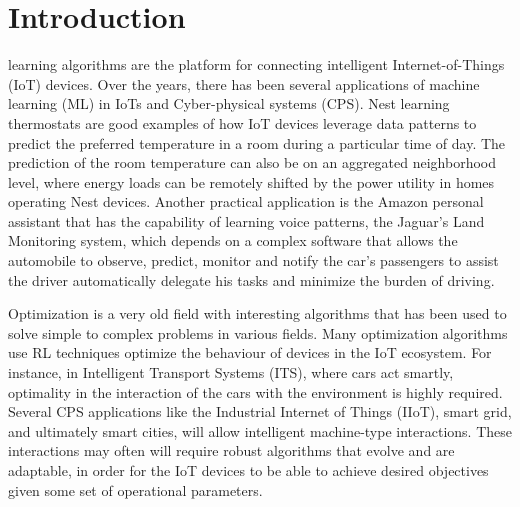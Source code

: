 \documentclass[journal]{IEEEtran}
\begin{document}
%
\IEEEpeerreviewmaketitle

\section{Introduction}
\label{sec:Introduction}
 learning algorithms are the platform for connecting intelligent Internet-of-Things (IoT) devices. Over the years, there has been several applications of machine learning (ML) in IoTs and Cyber-physical systems (CPS). Nest learning thermostats are good examples of how IoT devices leverage data patterns to predict the preferred temperature in a room during a particular time of day. The prediction of the room temperature can also be on an aggregated neighborhood level, where energy loads can be remotely shifted by the power utility in homes operating Nest devices. Another practical application is the Amazon personal assistant that has the capability of learning voice patterns, the Jaguar's Land Monitoring system, which depends on a complex software that allows the automobile to observe, predict, monitor and notify the car's passengers to assist the driver automatically delegate his tasks and minimize the burden of driving.

Optimization is a very old field with interesting algorithms that has been used to solve simple to complex problems in various fields. Many optimization algorithms use RL techniques optimize the behaviour of devices in the IoT ecosystem. For instance, in Intelligent Transport Systems (ITS), where cars act smartly, optimality in the interaction of the cars with the environment is highly required. Several CPS applications like the Industrial Internet of Things (IIoT), smart grid, and ultimately smart cities, will allow intelligent machine-type interactions. These interactions may often will require robust algorithms that evolve and are adaptable, in order for the IoT devices to be able to achieve desired objectives given some set of operational parameters.
\end{document}
